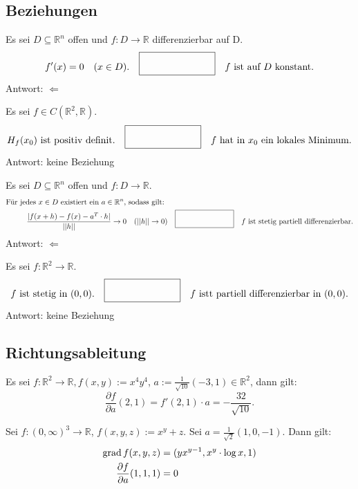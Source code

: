 \documentclass[parskip=full]{scrartcl}
\begin{document}
\subsection{Beziehungen}
Es sei $D \subseteq \mathbb{R}^n$ offen und $f : D \to \mathbb{R}$ differenzierbar auf D.
\begin{displaymath}
  f'(x) = 0 \quad (x \in D). \quad \fbox{\rule{1in}{0pt}\rule[-0.5ex]{0pt}{4ex}} \quad f \text{ ist auf } D \text{ konstant}.
\end{displaymath}
Antwort: $\Leftarrow$

Es sei $f \in C(\mathbb{R}^2, \mathbb{R})$.
\begin{displaymath}
  H_f(x_0) \text{ ist positiv definit.} \quad \fbox{\rule{1in}{0pt}\rule[-0.5ex]{0pt}{4ex}} \quad f \text{ hat in } x_0 \text{ ein lokales Minimum.}
\end{displaymath}
Antwort: keine Beziehung

Es sei $D \subseteq \mathbb{R}^n$ offen und $f : D \to \mathbb{R}$.
\begin{align*}
  \text{Für jedes } x \in D \text{ existiert ein } a \in \mathbb{R}^n \text{, sodass gilt: }&\\
  \frac{|f(x + h) - f(x) - a^T \cdot h|}{||h||} \to 0 \quad (||h|| \to 0)& \quad \fbox{\rule{1in}{0pt}\rule[-0.5ex]{0pt}{4ex}} \quad f \text{ ist stetig partiell differenzierbar.}
\end{align*}
Antwort: $\Leftarrow$

Es sei $f : \mathbb{R}^2 \to \mathbb{R}$.
\begin{displaymath}
  f \text{ ist stetig in } (0,0).
  \quad \fbox{\rule{1in}{0pt}\rule[-0.5ex]{0pt}{4ex}} \quad
  f \text{ istt partiell differenzierbar in } (0,0).
\end{displaymath}
Antwort: keine Beziehung

\subsection{Richtungsableitung}
Es sei $f : \mathbb{R}^2 \to \mathbb{R}, f(x,y) := x^4 y^4$, $a := \frac{1}{\sqrt{10}}(-3,1) \in \mathbb{R}^2$, dann gilt:
\begin{displaymath}
  \frac{\partial f}{\partial a} \left(2,1\right) = f'(2,1) \cdot a = -\frac{32}{\sqrt{10}}.
\end{displaymath}

Sei $f : (0,\infty)^3 \to \mathbb{R}$, $f(x,y,z) := x^y + z$.
Sei $a = \frac{1}{\sqrt{2}}(1, 0, -1)$.
Dann gilt:
\begin{align*}
  \operatorname{grad} f(x,y,z) &= (yx^{y - 1}, x^y \cdot \log x, 1)\\
  \frac{\partial f}{\partial a} (1,1,1) &= 0
\end{align*}
\end{document}
